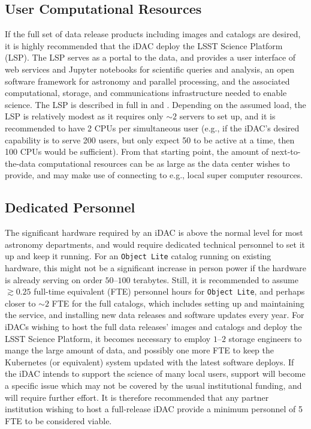\subsection{User Computational Resources}
If the full set of data release products including images and catalogs are desired, it is highly recommended that the iDAC deploy the LSST Science Platform (LSP). The LSP serves as a portal to the data, and provides a user interface of web services and Jupyter notebooks for scientific queries and analysis, an open software framework for astronomy and parallel processing, and the associated computational, storage, and communications infrastructure needed to enable science. The LSP is described in full in  and . Depending on the assumed load, the LSP is relatively modest as it requires only $\sim2$ servers to set up, and it is recommended to have 2 CPUs per simultaneous user (e.g., if the iDAC's desired capability is to serve 200 users, but only expect 50 to be active at a time, then 100 CPUs would be sufficient). From that starting point, the amount of next-to-the-data computational resources can be as large as the data center wishes to provide, and may make use of connecting to e.g., local super computer resources.

\subsection{Dedicated Personnel}
The significant hardware required by an iDAC is above the normal level for most astronomy departments, and would require dedicated technical personnel to set it up and keep it running. For an {\tt Object Lite} catalog running on existing hardware, this might not be a significant increase in person power if the hardware is already serving on order $50$--$100$ terabytes. Still, it is recommended to assume $\gtrsim0.25$ full-time equivalent (FTE) personnel hours for {\tt Object Lite}, and perhaps closer to $\sim2$ FTE for the full catalogs, which includes setting up and maintaining the service, and installing new data releases and software updates every year. For iDACs wishing to host the full data releases' images and catalogs and deploy the LSST Science Platform, it becomes necessary to employ $1$--$2$ storage engineers to mange the large amount of data, and possibly one more FTE to keep the Kubernetes (or equivalent) system updated with the latest software deploys. If the iDAC intends to support the science of many local users, support will become a specific issue which may not be covered by the usual institutional funding, and will require further effort. It is therefore recommended that any partner institution wishing to host a full-release iDAC provide a minimum personnel of 5 FTE to be considered viable.


